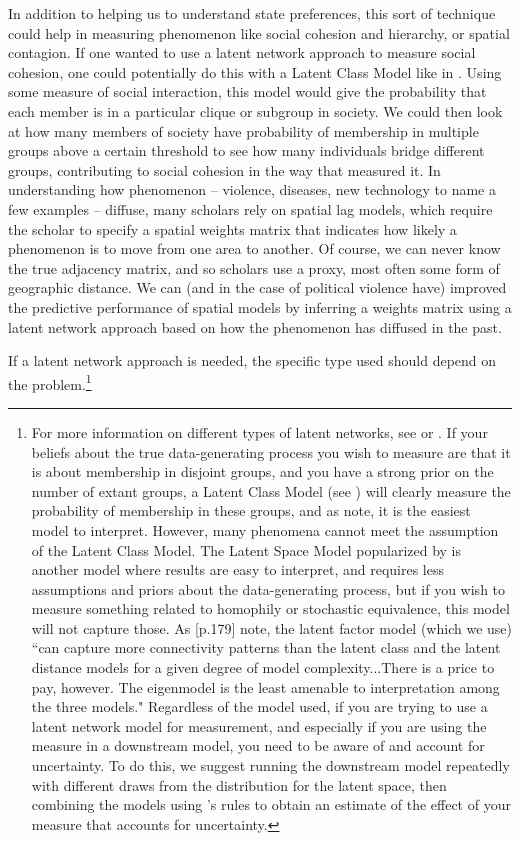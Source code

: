 In addition to helping us to understand state preferences, this sort of technique could help in measuring phenomenon like social cohesion and hierarchy, or spatial contagion. If one wanted to use a latent network approach to measure social cohesion, one could potentially do this with a Latent Class Model like in \citet{airoldi:etal:2006}. Using some measure of social interaction, this model would give the probability that each member is in a particular clique or subgroup in society. We could then look at how many members of society have probability of membership in multiple groups above a certain threshold to see how many individuals bridge different groups, contributing to social cohesion in the way that \citet{moody:white:2003} measured it. In understanding how phenomenon -- violence, diseases, new technology to name a few examples -- diffuse, many scholars rely on spatial lag models, which require the scholar to specify a spatial weights matrix that indicates how likely a phenomenon is to move from one area to another. Of course, we can never know the true adjacency matrix, and so scholars use a proxy, most often some form of geographic distance. We can (and in the case of political violence have) improved the predictive performance of spatial models by inferring a weights matrix using a latent network approach based on how the phenomenon has diffused in the past. 

If a latent network approach is needed, the specific type used should depend on the problem.\footnote{For more information on different types of latent networks, see \citet{minhas:etal:2018} or \citet{goldenberg:etal:2010}. If your beliefs about the true data-generating process you wish to measure are that it is about membership in disjoint groups, and you have a strong prior on the number of extant groups, a Latent Class Model (see \citet{airoldi:etal:2008}) will  clearly measure the probability of membership in these groups, and as \citet{goldenberg:etal:2010} note, it is the easiest model to interpret. However, many phenomena cannot meet the assumption of the Latent Class Model. The Latent Space Model popularized by \citet{handcock:etal:2008} is another model where results are easy to interpret, and requires less assumptions and priors about the data-generating process, but if you wish to measure something related to homophily or stochastic equivalence, this model will not capture those.  As \citet{goldenberg:etal:2010}[p.179] note, the latent factor model (which we use) ``can capture more connectivity patterns than the latent class and the latent distance models for a given degree of model complexity...There is a price to pay, however. The eigenmodel is the least amenable to interpretation among the three models." Regardless of the model used, if you are trying to use a latent network model for measurement, and especially if you are using the measure in a downstream model, you need to be aware of and account for uncertainty. To do this, we suggest running the downstream model repeatedly with different draws from the distribution for the latent space, then combining the models using \citet{rubin:1976}'s rules to obtain an estimate of the effect of your measure that accounts for uncertainty.}

